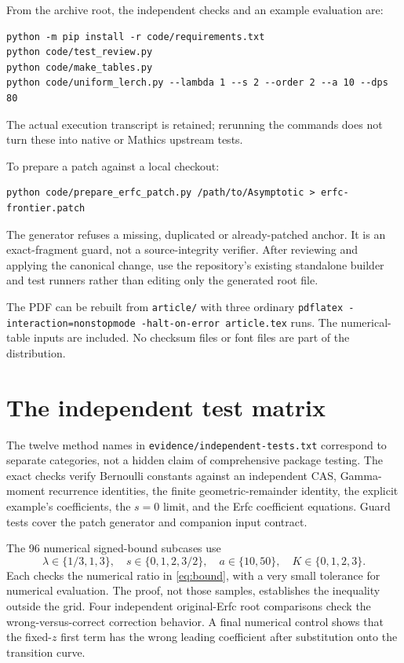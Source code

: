 \documentclass[11pt,a4paper]{article}
\newcommand{\code}[1]{\nolinkurl{#1}}
\begin{document}
From the archive root, the independent checks and an example evaluation are:
\begin{lstlisting}
python -m pip install -r code/requirements.txt
python code/test_review.py
python code/make_tables.py
python code/uniform_lerch.py --lambda 1 --s 2 --order 2 --a 10 --dps 80
\end{lstlisting}
The actual execution transcript is retained; rerunning the commands does not
turn these into native or Mathics upstream tests.

To prepare a patch against a local checkout:
\begin{lstlisting}
python code/prepare_erfc_patch.py /path/to/Asymptotic > erfc-frontier.patch
\end{lstlisting}
The generator refuses a missing, duplicated or already-patched anchor. It is
an exact-fragment guard, not a source-integrity verifier. After reviewing and
applying the canonical change, use the repository's existing standalone builder
and test runners rather than editing only the generated root file.

The PDF can be rebuilt from \code{article/} with three ordinary
\code{pdflatex -interaction=nonstopmode -halt-on-error article.tex} runs.
The numerical-table inputs are included. No checksum files or font files are
part of the distribution.

\section{The independent test matrix}

The twelve method names in \code{evidence/independent-tests.txt} correspond to
separate categories, not a hidden claim of comprehensive package testing.
The exact checks verify Bernoulli constants against an independent CAS,
Gamma-moment recurrence identities, the finite geometric-remainder identity,
the explicit example's coefficients, the $s=0$ limit, and the Erfc coefficient
equations. Guard tests cover the patch generator and companion input contract.

The 96 numerical signed-bound subcases use
\[
 \lambda\in\{1/3,1,3\},\quad
 s\in\{0,1,2,3/2\},\quad
 a\in\{10,50\},\quad K\in\{0,1,2,3\}.
\]
Each checks the numerical ratio in \eqref{eq:bound}, with a very small tolerance
for numerical evaluation. The proof, not those samples, establishes the
inequality outside the grid. Four independent original-Erfc root comparisons
check the wrong-versus-correct correction behavior. A final numerical control
shows that the fixed-$z$ first term has the wrong leading coefficient after
substitution onto the transition curve.
\end{document}
